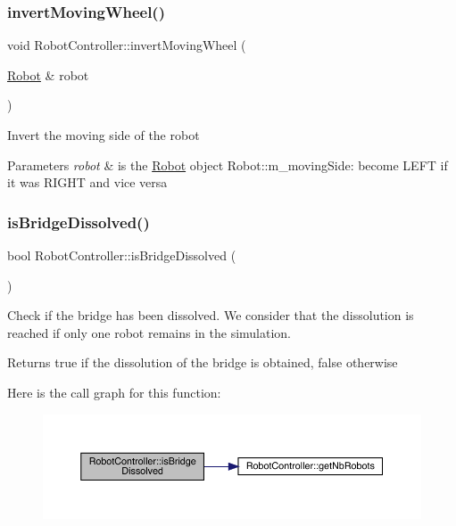 \subsubsection{\texorpdfstring{invert\+Moving\+Wheel()}{invertMovingWheel()}}
{\footnotesize\ttfamily void Robot\+Controller\+::invert\+Moving\+Wheel (\begin{DoxyParamCaption}\item[{\mbox{\hyperlink{class_robot}{Robot}} \&}]{robot }\end{DoxyParamCaption})}

Invert the moving side of the robot 
\begin{DoxyParams}{Parameters}
{\em robot} & is the \mbox{\hyperlink{class_robot}{Robot}} object  Robot\+::m\+\_\+moving\+Side\+: become L\+E\+FT if it was R\+I\+G\+HT and vice versa \\
\hline
\end{DoxyParams}
\mbox{\label{class_robot_controller_a5f3c279e0082ea8dbfe03fd32d8e42b5}} 
\subsubsection{\texorpdfstring{is\+Bridge\+Dissolved()}{isBridgeDissolved()}}
{\footnotesize\ttfamily bool Robot\+Controller\+::is\+Bridge\+Dissolved (\begin{DoxyParamCaption}{ }\end{DoxyParamCaption})}

Check if the bridge has been dissolved. We consider that the dissolution is reached if only one robot remains in the simulation. \begin{DoxyReturn}{Returns}
true if the dissolution of the bridge is obtained, false otherwise 
\end{DoxyReturn}
Here is the call graph for this function\+:\nopagebreak
\begin{figure}[H]
\begin{center}
\leavevmode
\includegraphics[width=350pt]{class_robot_controller_a5f3c279e0082ea8dbfe03fd32d8e42b5_cgraph}
\end{center}
\end{figure}
\mbox{\label{class_robot_controller_a05233232614480ea30138101f730a329}} 
